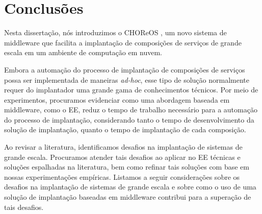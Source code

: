\chapter{Conclusões}
\label{cap:conclusoes}

Nesta dissertação, nós introduzimos o CHOReOS \ee,
um novo sistema de middleware que facilita a implantação de composições
de serviços de grande escala em um ambiente de computação em nuvem.

Embora a automação do processo de implantação de composições de serviços
possa ser implementada de maneiras \emph{ad-hoc},
esse tipo de solução normalmente requer do implantador
uma grande gama de conhecimentos técnicos.
Por meio de experimentos, procuramos evidenciar como
uma abordagem baseada em middleware, como o EE,
reduz o tempo de trabalho necessário para a automação
do processo de implantação, considerando tanto o tempo
de desenvolvimento da solução de implantação,
quanto o tempo de implantação de cada composição.

Ao revisar a literatura, identificamos desafios na implantação
de sistemas de grande escala. 
Procuramos atender tais desafios ao aplicar no EE
técnicas e soluções espalhadas na literatura,
bem como refinar tais soluções com base em 
nossas experimentações empíricas.
Listamos a seguir considerações sobre os desafios na
implantação de sistemas de grande escala
e sobre como o uso de uma solução de implantação
baseadas em middleware contribui para a superação
de tais desafios.

